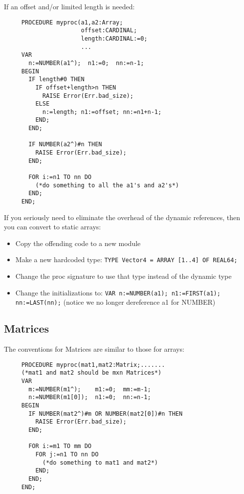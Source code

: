 If an offset and/or limited length is needed:
\begin{tt} \begin{verbatim}
     PROCEDURE myproc(a1,a2:Array;
                      offset:CARDINAL;
                      length:CARDINAL:=0;
                      ...
     VAR
       n:=NUMBER(a1^);  n1:=0;  nn:=n-1;
     BEGIN
       IF length#0 THEN
         IF offset+length>n THEN
           RAISE Error(Err.bad_size);
         ELSE
           n:=length; n1:=offset; nn:=n1+n-1;
         END;
       END;
     
       IF NUMBER(a2^)#n THEN
         RAISE Error(Err.bad_size);
       END;
     
       FOR i:=n1 TO nn DO
         (*do something to all the a1's and a2's*)
       END;
     END;
\end{verbatim} \end{tt}

If you seriously need to eliminate the overhead of the
dynamic references, then you can convert to static arrays:
\begin{itemize}
   \item Copy the offending code to a new module
   \item Make a new hardcoded type:
       {\tt TYPE Vector4 = ARRAY [1..4] OF REAL64;}
   \item Change the proc signature to use that type instead
       of the dynamic type
   \item Change the initializations to:
       {\tt VAR n:=NUMBER(a1); n1:=FIRST(a1); nn:=LAST(nn);}
       (notice we no longer dereference a1 for NUMBER)
\end{itemize}
     
\subsection{Matrices}
The conventions for Matrices are similar to those for
arrays:
\begin{tt} \begin{verbatim}
     PROCEDURE myproc(mat1,mat2:Matrix;.......
     (*mat1 and mat2 should be mxn Matrices*)
     VAR
       m:=NUMBER(m1^);    m1:=0;  mm:=m-1;
       n:=NUMBER(m1[0]);  n1:=0;  nn:=n-1;
     BEGIN
       IF NUMBER(mat2^)#m OR NUMBER(mat2[0])#n THEN
         RAISE Error(Err.bad_size);
       END;
     
       FOR i:=m1 TO mm DO
         FOR j:=n1 TO nn DO
           (*do something to mat1 and mat2*)
         END;
       END;
     END;
\end{verbatim} \end{tt}
